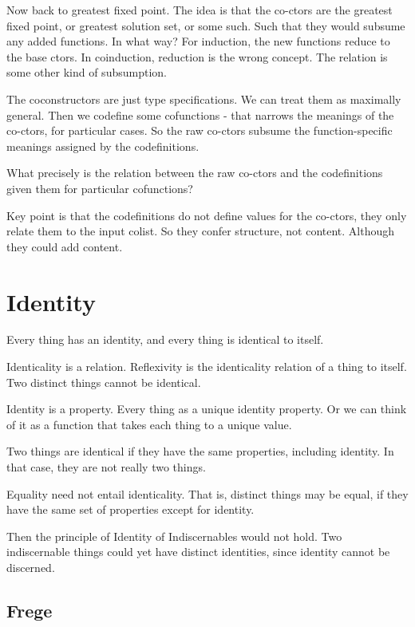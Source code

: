 \documentclass{article}
\begin{document}
Now back to greatest fixed point. The idea is that the co-ctors are
the greatest fixed point, or greatest solution set, or some such. Such
that they would subsume any added functions. In what way? For
induction, the new functions reduce to the base ctors. In coinduction,
reduction is the wrong concept. The relation is some other kind of
subsumption.

The coconstructors are just type specifications. We can treat them as
maximally general. Then we codefine some cofunctions - that narrows
the meanings of the co-ctors, for particular cases. So the raw
co-ctors subsume the function-specific meanings assigned by the
codefinitions.

What precisely is the relation between the raw co-ctors and the
codefinitions given them for particular cofunctions?

Key point is that the codefinitions do not define values for the
co-ctors, they only relate them to the input colist. So they confer
structure, not content.  Although they could add content.

\section{Identity}
Every thing has an identity, and every thing is identical to itself.

Identicality is a relation. Reflexivity is the identicality relation
of a thing to itself. Two distinct things cannot be identical.

Identity is a property. Every thing as a unique identity property. Or
we can think of it as a function that takes each thing to a unique
value.

Two things are identical if they have the same properties, including
identity. In that case, they are not really two things.

Equality need not entail identicality. That is, distinct things may be
equal, if they have the same set of properties except for identity.

Then the principle of Identity of Indiscernables would not hold. Two
indiscernable things could yet have distinct identities, since
identity cannot be discerned.

\subsection{Frege}

\end{document}
